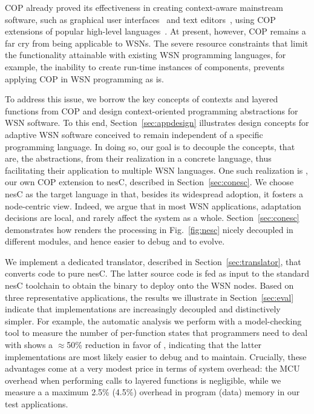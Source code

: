 COP already proved its effectiveness in creating context-aware
mainstream software, such as graphical user interfaces~\cite{Keays03}
and text editors~\cite{Kamina11}, using COP extensions of popular
high-level languages~\cite{Salvaneschi12}. At present, however, COP
remains a far cry from being applicable to WSNs. The severe resource
constraints that limit the functionality attainable with existing WSN
programming languages, for example, the inability to create run-time
instances of components, prevents applying COP in WSN programming as
is.

To address this issue, we borrow the key concepts of contexts and
layered functions from COP and design context-oriented programming
abstractions for WSN software. To this end,
Section~\ref{sec:appdesign} illustrates design concepts for adaptive
WSN software conceived to remain independent of a specific programming
language. In doing so, our goal is to decouple the concepts, that are,
the abstractions, from their realization in a concrete language, thus
facilitating their application to multiple WSN languages. One such
realization is \conesc, our own COP extension to nesC, described in
Section~\ref{sec:conesc}. We choose nesC as the target language in
that, besides its widespread adoption, it fosters a node-centric
view. Indeed, we argue that in most WSN applications, adaptation
decisions are local, and rarely affect the system as a
whole. Section~\ref{sec:conesc} demonstrates how \conesc renders the
processing in Fig.~\ref{fig:nesc} nicely decoupled in different
modules, and hence easier to debug and to evolve.

We implement a dedicated translator, described in
Section~\ref{sec:translator}, that converts \conesc code to pure
nesC. The latter source code is fed as input to the standard nesC
toolchain to obtain the binary to deploy onto the WSN nodes. Based on
three representative applications, the results we illustrate in
Section~\ref{sec:eval} indicate that \conesc implementations are
increasingly decoupled and distinctively simpler. For example, the
automatic analysis we perform with a model-checking tool to measure
the number of per-function states that programmers need to deal with
shows a $\approx$50\% reduction in favor of \conesc, indicating that
the latter implementations are most likely easier to debug and to
maintain. Crucially, these advantages come at a very modest price in
terms of system overhead: the MCU overhead when performing calls to
layered functions is negligible, while we measure a a maximum 2.5\%
(4.5\%) overhead in program (data) memory in our test applications.

